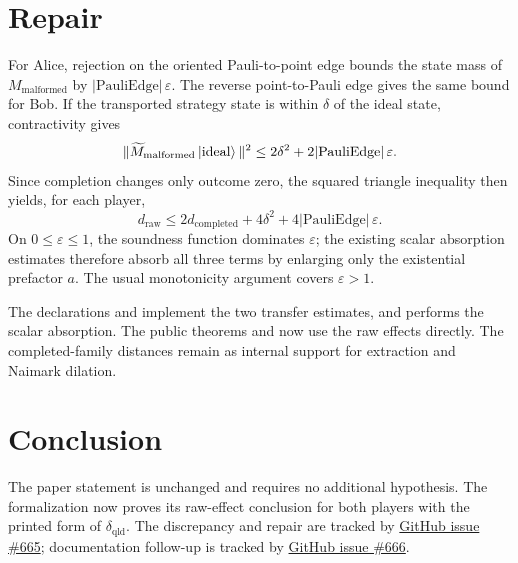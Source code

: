\documentclass[11pt]{article}
\renewcommand{\ghissue}[1]{%
  \href{https://github.com/Dengnifer/MIPStarRE-QPBT/issues/#1}{GitHub issue \##1}}
\begin{document}
\section{Repair}

For Alice, rejection on the oriented Pauli-to-point edge bounds the state
mass of $M_{\mathrm{malformed}}$ by
$|\mathrm{PauliEdge}|\,\varepsilon$.  The reverse point-to-Pauli edge gives
the same bound for Bob.  If the transported strategy state is within
$\delta$ of the ideal state, contractivity gives
\[
  \|\widetilde M_{\mathrm{malformed}}\ket{\mathrm{ideal}}\|^2
  \leq 2\delta^2+2|\mathrm{PauliEdge}|\,\varepsilon.
\]
Since completion changes only outcome zero, the squared triangle inequality
then yields, for each player,
\[
  d_{\mathrm{raw}}
  \leq 2d_{\mathrm{completed}}+4\delta^2
      +4|\mathrm{PauliEdge}|\,\varepsilon.
\]
On $0\leq\varepsilon\leq1$, the soundness function dominates
$\varepsilon$; the existing scalar absorption estimates therefore absorb all
three terms by enlarging only the existential prefactor $a$.  The usual
monotonicity argument covers $\varepsilon>1$.

The declarations
 and
 implement the two
transfer estimates, and
 performs the
scalar absorption.  The public theorems  and
 now use the raw effects directly.  The
completed-family distances remain as internal support for extraction and
Naimark dilation.

\section{Conclusion}

The paper statement is unchanged and requires no additional hypothesis.  The
formalization now proves its raw-effect conclusion for both players with the
printed form of $\delta_{\mathrm{qld}}$.  The discrepancy and repair are
tracked by \ghissue{665}; documentation follow-up is tracked by
\ghissue{666}.



\end{document}
